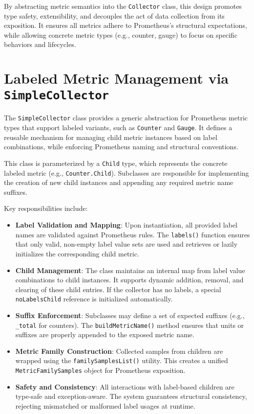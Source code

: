 By abstracting metric semantics into the \texttt{Collector} class, this design promotes type safety, extensibility, and decouples the act of data collection from its exposition. It ensures all metrics adhere to Prometheus's structural expectations, while allowing concrete metric types (e.g., counter, gauge) to focus on specific behaviors and lifecycles.

\section{Labeled Metric Management via \texttt{SimpleCollector}}

The \texttt{SimpleCollector} class provides a generic abstraction for Prometheus metric types that support labeled variants, such as \texttt{Counter} and \texttt{Gauge}. It defines a reusable mechanism for managing child metric instances based on label combinations, while enforcing Prometheus naming and structural conventions.

This class is parameterized by a \texttt{Child} type, which represents the concrete labeled metric (e.g., \texttt{Counter.Child}). Subclasses are responsible for implementing the creation of new child instances and appending any required metric name suffixes.

Key responsibilities include:
\begin{itemize}
    \item \textbf{Label Validation and Mapping}: Upon instantiation, all provided label names are validated against Prometheus rules. The \texttt{labels()} function ensures that only valid, non-empty label value sets are used and retrieves or lazily initializes the corresponding child metric.

    \item \textbf{Child Management}: The class maintains an internal map from label value combinations to child instances. It supports dynamic addition, removal, and clearing of these child entries. If the collector has no labels, a special \texttt{noLabelsChild} reference is initialized automatically.

    \item \textbf{Suffix Enforcement}: Subclasses may define a set of expected suffixes (e.g., \texttt{\_total} for counters). The \texttt{buildMetricName()} method ensures that units or suffixes are properly appended to the exposed metric name.

    \item \textbf{Metric Family Construction}: Collected samples from children are wrapped using the \texttt{familySamplesList()} utility. This creates a unified \texttt{MetricFamilySamples} object for Prometheus exposition.

    \item \textbf{Safety and Consistency}: All interactions with label-based children are type-safe and exception-aware. The system guarantees structural consistency, rejecting mismatched or malformed label usages at runtime.
\end{itemize}

